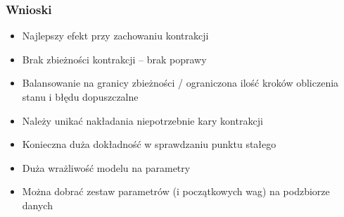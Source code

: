 \documentclass{beamer}
\begin{document}
\begin{frame}
\frametitle{Wnioski}
\begin{itemize}
	\item Najlepszy efekt przy zachowaniu kontrakcji
	\item Brak zbieżności kontrakcji – brak poprawy
	\item Balansowanie na granicy zbieżności / ograniczona ilość kroków obliczenia stanu i błędu dopuszczalne
	\item Należy unikać nakładania niepotrzebnie kary kontrakcji
	\item Konieczna duża dokładność w sprawdzaniu punktu stałego
	\item Duża wrażliwość modelu na parametry
	\item Można dobrać zestaw parametrów (i początkowych wag) na podzbiorze danych
\end{itemize}
\end{frame}
\end{document}
